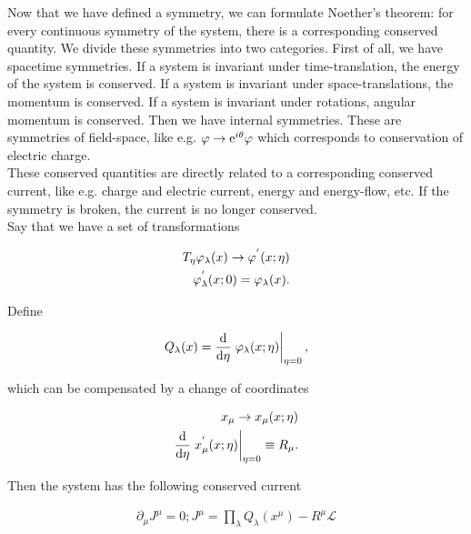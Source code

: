 Now that we have defined a symmetry, we can formulate Noether's theorem: for every continuous symmetry of the system, there is a corresponding conserved quantity. We divide these symmetries into two categories. First of all, we have spacetime symmetries. If a system is invariant under time-translation, the energy of the system is conserved. If a system is invariant under space-translations, the momentum is conserved. If a system is invariant under rotations, angular momentum is conserved. Then we have internal symmetries. These are symmetries of field-space, like e.g. $\varphi \to \mathrm{e}^{i\theta}\varphi$ which corresponds to conservation of electric charge. \\ 

These conserved quantities are directly related to a corresponding conserved current, like e.g. charge and electric current, energy and energy-flow, etc. If the symmetry is broken, the current is no longer conserved. \\ 

Say that we have a set of transformations 

\begin{align*}
    T_\eta \varphi_\lambda (x) \to \varphi^{'} (x; \eta) \\
    \varphi_\lambda^{'} (x; 0) = \varphi_\lambda (x). 
\end{align*}

Define 

\begin{align*}
    Q_\lambda (x) = \dv{}{\eta}\eval{\p_\lambda (x; \eta)}_{\eta = 0},
\end{align*}

which can be compensated by a change of coordinates 

\begin{align*}
    x_\mu \to x_\mu (x; \eta) \\ 
    \dv{}{\eta} \eval{x_\mu^{'} (x; \eta)}_{\eta = 0} \equiv R_\mu.
\end{align*}

Then the system has the following conserved current 

\begin{align*}
    \partial_\mu J^\mu = 0; J^\mu = \prod_\lambda Q_\lambda (x^\mu) - R^\mu \mathcal{L}
\end{align*}